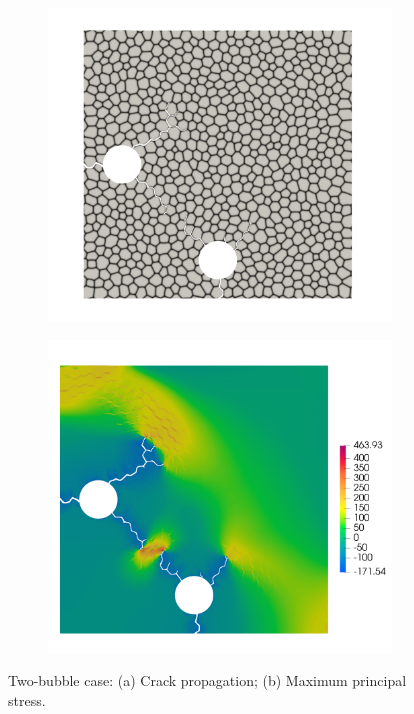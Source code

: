 \begin{figure}[htb!]
  \centering
  \begin{subfigure}[t]{0.49\linewidth}
    \centering
    \includegraphics[width=\linewidth]{Chapter3/figures/two_bubbles_bnd}
    \caption{}
  \end{subfigure}
  \begin{subfigure}[t]{0.49\linewidth}
    \centering
    \includegraphics[width=\linewidth]{Chapter3/figures/two_bubbles_stress}
    \caption{}
  \end{subfigure}
  \caption{\label{fig:two_bubbles} Two-bubble case: (a) Crack propagation; (b) Maximum principal stress.}
\end{figure}

